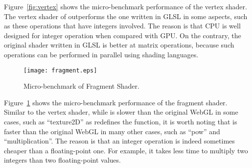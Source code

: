 Figure~\ref{fig:vertex} shows the micro-benchmark performance of the vertex shader.  The vertex shader of \sys outperforms the one written in GLSL in some aspects, such as these operations that have integers involved.  The reason is that CPU is well designed for integer operation when compared with GPU.  On the contrary, the original shader written in GLSL is better at  matrix operations, because such operations can be performed in parallel using shading languages. 
 


 

\begin{figure}
\centering
\texttt{[image: fragment.eps]} %
\vspace{-0.35in}
\caption{Micro-benchmark of Fragment Shader. }
\label{fig:fragment}
\vspace{-0.15in}
\end{figure} 


Figure~\ref{fig:fragment} shows the micro-benchmark performance of the fragment shader.  Similar to the vertex shader, while \sys is slower than the original WebGL in some cases, such as ``texture2D'' as \sys redefines the function, it is worth noting that \sys is faster than the original WebGL in many other cases, such as ``pow'' and ``multiplication''.  The reason is that an integer operation is indeed sometimes cheaper than a floating-point one.  For example, it takes less time to multiply two integers than two floating-point values.  


